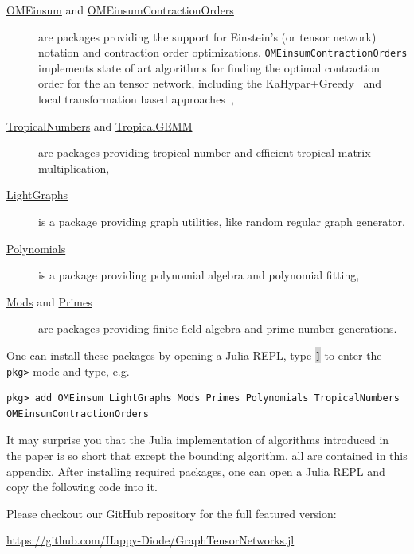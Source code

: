 \documentclass[onefignum, onetabnum]{siamart190516}
\newcommand{\<}{\langle}
\renewcommand{\>}{\rangle}
\begin{document}
\begin{description}
	\item[\href{https://github.com/under-Peter/OMEinsum.jl}{OMEinsum} and \href{https://github.com/Happy-Diode/OMEinsumContractionOrders.jl}{OMEinsumContractionOrders}] are packages providing the support for Einstein's (or tensor network) notation and contraction order optimizations.
    \texttt{OMEinsumContractionOrders} implements state of art algorithms for finding the optimal contraction order for the an tensor network, including the KaHypar+Greedy~\cite{Gray2021, Pan2021} and local transformation based approaches~\cite{Kalachev2021},
	\item[\href{https://github.com/TensorBFS/TropicalNumbers.jl}{TropicalNumbers} and \href{https://github.com/TensorBFS/TropicalGEMM.jl}{TropicalGEMM}] are packages providing tropical number and efficient tropical matrix multiplication,
	\item[\href{https://github.com/JuliaGraphs/LightGraphs.jl}{LightGraphs}] is a package providing graph utilities, like random regular graph generator,
	\item[\href{https://github.com/JuliaMath/Polynomials.jl}{Polynomials}] is a package providing polynomial algebra and polynomial fitting,
	\item[\href{https://github.com/scheinerman/Mods.jl}{Mods} and \href{https://github.com/JuliaMath/Primes.jl}{Primes}] are packages providing finite field algebra and prime number generations.
\end{description}

One can install these packages by opening a Julia REPL, type \colorbox{lightgray}{\texttt{]}} to enter the \texttt{pkg>} mode and type, e.g.
\begin{lstlisting}
pkg> add OMEinsum LightGraphs Mods Primes Polynomials TropicalNumbers OMEinsumContractionOrders
\end{lstlisting}

It may surprise you that the Julia implementation of algorithms introduced in the paper is so short that except the bounding algorithm,
all are contained in this appendix. After installing required packages, one can open a Julia REPL and copy the following code into it.



Please checkout our GitHub repository for the full featured version:

\href{https://github.com/Happy-Diode/GraphTensorNetworks.jl}{https://github.com/Happy-Diode/GraphTensorNetworks.jl}
\end{document}
